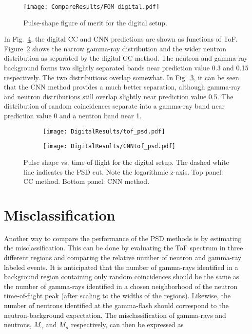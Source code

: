 \documentclass[main.tex]{subfiles}
\begin{document}
\begin{figure}[h!]
	    \centering
    	    \texttt{[image: CompareResults/FOM\_digital.pdf]}
	    \caption[Pulse-shape figure-of-merit for the digital setup.]{Pulse-shape figure of merit for the digital setup.}
   	    \label{fig:fom_d} 
\end{figure}

In Fig.~\ref{fig:tof_cc_tof_cnn}, the digital CC and CNN predictions are shown as functions of ToF. Figure~\ref{fig:tof_digi_cc} shows the narrow gamma-ray distribution and the wider neutron distribution as separated by the digital CC method. 
The neutron and gamma-ray background forms two slightly separated bands near prediction value 0.3 and 0.15 respectively. The two distributions overlap somewhat.  
In Fig.~\ref{fig:tof_digi_cnn}, it can be seen that the CNN method provides a much better separation, although gamma-ray and neutron distributions still overlap slightly near prediction value 0.5. The distribution of random coincidences separate into a gamma-ray band near prediction value 0 and a neutron band near 1.


\begin{figure}
    \centering
    \begin{subfigure}[ht]{\textwidth}
    	\centering
        \texttt{[image: DigitalResults/tof\_psd.pdf]}
        \caption{}
        \label{fig:tof_digi_cc}
    \end{subfigure}
	\begin{subfigure}[ht]{\textwidth}
		\centering
        \texttt{[image: DigitalResults/CNNtof\_psd.pdf]}
        \caption{}
        \label{fig:tof_digi_cnn}
    \end{subfigure}
    \caption[Pulse shape vs. time-of-flight for the digital setup.]{Pulse shape vs. time-of-flight for the digital setup. The dashed white line indicates the PSD cut. Note the logarithmic z-axis. Top panel: CC method. Bottom panel: CNN method.}
    \label{fig:tof_cc_tof_cnn}
\end{figure}


\clearpage
\section{Misclassification}\label{sec:comp}


Another way to compare the performance of the PSD methods is by estimating the misclassification. This can be done by evaluating the ToF spectrum in three different regions and comparing the relative number of neutron and gamma-ray labeled events. It is anticipated that the number of gamma-rays identified in a background region containing only random coincidences should be the same as the number of gamma-rays identified in a chosen neighborhood of the neutron time-of-flight peak (after scaling to the widths of the regions). Likewise, the number of neutrons identified at the gamma-flash should correspond to the neutron-background expectation. The misclassification of gamma-rays and neutrons, $M_{\gamma}$ and $M_{n}$ respectively, can then be expressed as
\end{document}
